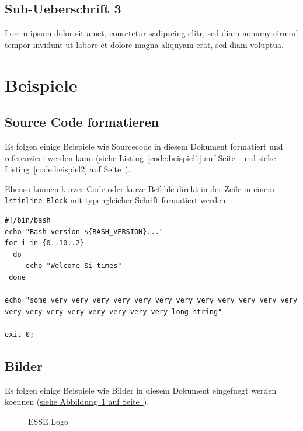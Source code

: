 \documentclass[12pt,a4paper,titlepage,oneside]{scrartcl}
\begin{document}
\subsection{Sub-Ueberschrift 3}
Lorem ipsum dolor sit amet, consetetur sadipscing elitr, sed diam nonumy eirmod tempor invidunt ut labore et dolore magna aliquyam erat, sed diam voluptua. 

\section{Beispiele}

\subsection{Source Code formatieren}
Es folgen einige Beispiele wie Sourcecode in diesem Dokument formatiert und referenziert werden kann
(\hyperref[code:beispiel1]{siehe Listing~\ref*{code:beispiel1} auf Seite~\pageref*{code:beispiel1}} und \hyperref[code:beispiel2]{siehe Listing~\ref*{code:beispiel2} auf Seite~\pageref*{code:beispiel2}}).

Ebenso können kurzer Code oder kurze Befehle direkt in der Zeile in einem \lstinline{lstinline Block} mit typengleicher Schrift formatiert werden.



\begin{lstlisting}[caption=Example bash script,label=code:beispiel2,style=simple]
#!/bin/bash
echo "Bash version ${BASH_VERSION}..."
for i in {0..10..2}
  do
     echo "Welcome $i times"
 done

echo "some very very very very very very very very very very very very very very very very very very very very long string"

exit 0;
\end{lstlisting}

\subsection{Bilder}

Es folgen einige Beispiele wie Bilder in diesem Dokument eingefuegt werden koennen
(\hyperref[fig:logo1]{siehe Abbildung~\ref*{fig:logo1} auf Seite~\pageref*{fig:logo1}}).

\begin{figure}[h!]
  \centering
  \caption{ESSE Logo}
  \label{fig:logo1}
\end{figure}
\end{document}
